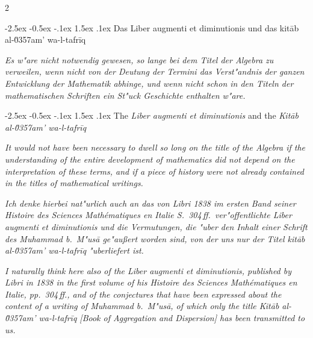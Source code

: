\documentclass[10pt,a4paper]{article}
\makeatletter
\renewcommand{\section}{\@startsection{section}{1}{\z@}%
  {-2.5ex \@plus -0.5ex \@minus -.1ex}%
  {1.5ex \@plus .1ex}%
  {\normalfont\large\bfseries\color{sectioncolor}}}
\makeatother
\begin{document}
\begin{paracol}{2}

\section{Das Liber augmenti et diminutionis und das kit\=ab al-\u0357{}am' wa-l-tafr\={i}q}

\textit{Es w"are nicht notwendig gewesen, so lange bei dem Titel der Algebra zu verweilen, wenn nicht von der Deutung der Termini das Verst"andnis der ganzen Entwicklung der Mathematik abhinge, und wenn nicht schon in den Titeln der mathematischen Schriften ein St"uck Geschichte enthalten w"are.}

\switchcolumn

\section{The \textit{Liber augmenti et diminutionis} and the \textit{Kit\=ab al-\u0357{}am' wa-l-tafr\={i}q}}

\textit{It would not have been necessary to dwell so long on the title of the Algebra if the understanding of the entire development of mathematics did not depend on the interpretation of these terms, and if a piece of history were not already contained in the titles of mathematical writings.}

\switchcolumn*

\textit{Ich denke hierbei nat"urlich auch an das von Libri 1838 im ersten Band seiner \textit{Histoire des Sciences Math\'ematiques en Italie} S.\ 304\,ff.\ ver"offentlichte \textit{Liber augmenti et diminutionis} und die Vermutungen, die "uber den Inhalt einer Schrift des Muhammad b.\ M"us\=a ge"au\ss{}ert worden sind, von der uns nur der Titel \textit{kit\=ab al-\u0357{}am' wa-l-tafr\={i}q} "uberliefert ist.}

\switchcolumn

\textit{I naturally think here also of the \textit{Liber augmenti et diminutionis}, published by Libri in 1838 in the first volume of his \textit{Histoire des Sciences Math\'ematiques en Italie}, pp.\ 304\,ff., and of the conjectures that have been expressed about the content of a writing of Muhammad b.\ M"us\=a, of which only the title \textit{Kit\=ab al-\u0357{}am' wa-l-tafr\={i}q} [Book of Aggregation and Dispersion] has been transmitted to us.}


\end{paracol}
\end{document}
